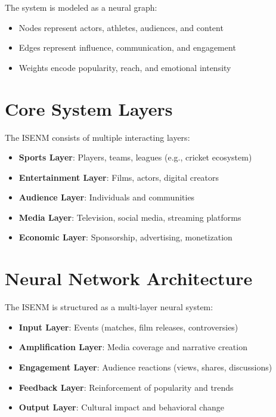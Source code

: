 \documentclass[12pt]{article}
\begin{document}
The system is modeled as a neural graph:

\begin{itemize}
\item Nodes represent actors, athletes, audiences, and content
\item Edges represent influence, communication, and engagement
\item Weights encode popularity, reach, and emotional intensity
\end{itemize}

\section{Core System Layers}

The ISENM consists of multiple interacting layers:

\begin{itemize}
\item \textbf{Sports Layer}: Players, teams, leagues (e.g., cricket ecosystem)
\item \textbf{Entertainment Layer}: Films, actors, digital creators
\item \textbf{Audience Layer}: Individuals and communities
\item \textbf{Media Layer}: Television, social media, streaming platforms
\item \textbf{Economic Layer}: Sponsorship, advertising, monetization
\end{itemize}

\section{Neural Network Architecture}

The ISENM is structured as a multi-layer neural system:

\begin{itemize}
\item \textbf{Input Layer}: Events (matches, film releases, controversies)
\item \textbf{Amplification Layer}: Media coverage and narrative creation
\item \textbf{Engagement Layer}: Audience reactions (views, shares, discussions)
\item \textbf{Feedback Layer}: Reinforcement of popularity and trends
\item \textbf{Output Layer}: Cultural impact and behavioral change
\end{itemize}
\end{document}

